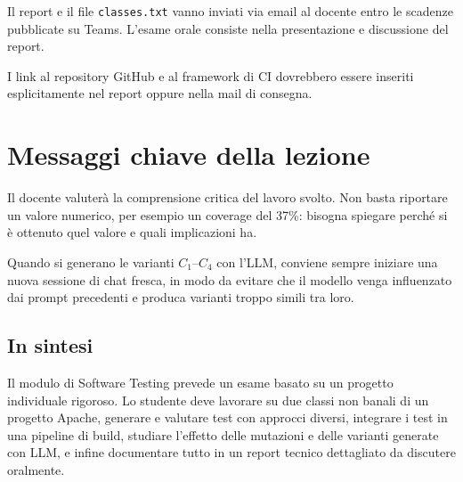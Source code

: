 Il report e il file \texttt{classes.txt} vanno inviati via email al docente entro le scadenze pubblicate su Teams. L'esame orale consiste nella presentazione e discussione del report.

\begin{notaprof}
I link al repository GitHub e al framework di CI dovrebbero essere inseriti esplicitamente nel report oppure nella mail di consegna.
\end{notaprof}

\section{Messaggi chiave della lezione}

\begin{notaesame}
Il docente valuterà la comprensione critica del lavoro svolto. Non basta riportare un valore numerico, per esempio un coverage del 37\%: bisogna spiegare perché si è ottenuto quel valore e quali implicazioni ha.
\end{notaesame}

\begin{notaprof}
Quando si generano le varianti \(C_1\)--\(C_4\) con l'LLM, conviene sempre iniziare una nuova sessione di chat fresca, in modo da evitare che il modello venga influenzato dai prompt precedenti e produca varianti troppo simili tra loro.
\end{notaprof}

\subsection*{In sintesi}

Il modulo di Software Testing prevede un esame basato su un progetto individuale rigoroso. Lo studente deve lavorare su due classi non banali di un progetto Apache, generare e valutare test con approcci diversi, integrare i test in una pipeline di build, studiare l'effetto delle mutazioni e delle varianti generate con LLM, e infine documentare tutto in un report tecnico dettagliato da discutere oralmente.